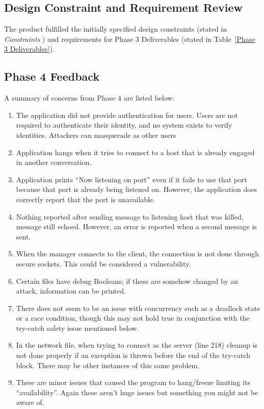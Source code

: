 \documentclass[sigconf]{acmart}
\begin{document}
\subsection{Design Constraint and Requirement Review}
The product fulfilled the initially specified design constraints (stated in
\textit{Constraints} ) and requirements for Phase 3 Deliverables (stated in
Table~\ref{Phase 3 Deliverables}).
\subsection{Phase 4 Feedback}
A summary of concerns from Phase 4 are listed below:
\begin{enumerate}
	\item The application did not provide authentication for users. Users are
	      not required to authenticate their identity, and no system exists to
	      verify identities. Attackers can masquerade as other users
	\item Application hangs when it tries to connect to a host that is already
	      engaged in another conversation.
	\item Application prints “Now listening on port” even if it fails to use
	      that port because that port is already being listened on. However,
	      the application does correctly report that the port is unavailable.
	\item Nothing reported after sending message to listening host that was
	      killed, message still echoed. However, an error is reported when a
	      second message is sent.
	\item When the manager connects to the client, the connection is not done
	      through secure sockets. This could be considered a vulnerability.
	\item Certain files have debug Booleans; if these are somehow changed by an
	      attack, information can be printed.
	\item There does not seem to be an issue with concurrency such as a
	      deadlock state or a race condition, though this may not hold true in
	      conjunction with the try-catch safety issue mentioned below.
	\item In the network file, when trying to connect as the server (line 218)
	      cleanup is not done properly if an exception is thrown before the end
	      of the try-catch block. There may be other instances of this same
	      problem.
	\item These are minor issues that caused the program to hang/freeze
	      limiting its “availability”. Again these aren’t huge issues but
	      something you might not be aware of.
\end{enumerate}
\end{document}
